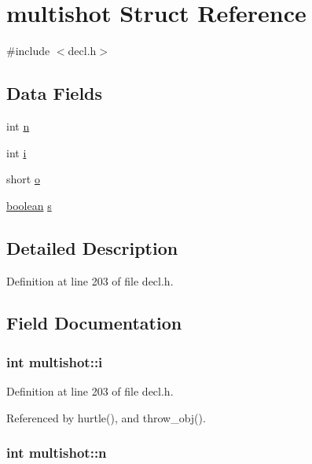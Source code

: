 \hypertarget{structmultishot}{\section{multishot Struct Reference}
\label{structmultishot}
}


{\ttfamily \#include $<$decl.\+h$>$}

\subsection*{Data Fields}
\begin{DoxyCompactItemize}
\item 
int \hyperlink{structmultishot_a62215723667a2eb09dd1203380b62f21}{n}
\item 
int \hyperlink{structmultishot_a16373f5f59db22df2bb5b29279c3ecc4}{i}
\item 
short \hyperlink{structmultishot_addd43be0e56011781a690bb29031f58e}{o}
\item 
\hyperlink{global_8h_a531b10dd351aa162d7dcccd1966308b8}{boolean} \hyperlink{structmultishot_acc85ac2a091e5aec36d1b5d308775ffe}{s}
\end{DoxyCompactItemize}


\subsection{Detailed Description}


Definition at line 203 of file decl.\+h.



\subsection{Field Documentation}
\hypertarget{structmultishot_a16373f5f59db22df2bb5b29279c3ecc4}{
\subsubsection[{i}]{\setlength{\rightskip}{0pt plus 5cm}int multishot\+::i}}\label{structmultishot_a16373f5f59db22df2bb5b29279c3ecc4}


Definition at line 203 of file decl.\+h.



Referenced by hurtle(), and throw\+\_\+obj().

\hypertarget{structmultishot_a62215723667a2eb09dd1203380b62f21}{
\subsubsection[{n}]{\setlength{\rightskip}{0pt plus 5cm}int multishot\+::n}}\label{structmultishot_a62215723667a2eb09dd1203380b62f21}


